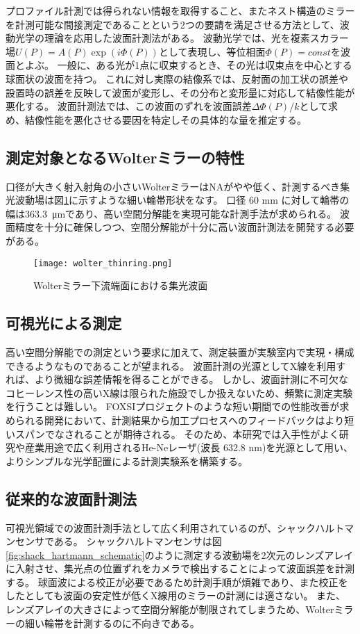 プロファイル計測では得られない情報を取得すること、またネスト構造のミラーを計測可能な間接測定であることという2つの要請を満足させる方法として、波動光学の理論を応用した波面計測法がある。
波動光学では、光を複素スカラー場$U(P)=A(P)\exp(i\Phi(P))$として表現し、等位相面$\Phi(P)=const$を波面とよぶ。
一般に、ある光が1点に収束するとき、その光は収束点を中心とする球面状の波面を持つ。
これに対し実際の結像系では、反射面の加工状の誤差や設置時の誤差を反映して波面が変形し、その分布と変形量に対応して結像性能が悪化する。
波面計測法では、この波面のずれを波面誤差$\Delta\Phi(P)/k$として求め、結像性能を悪化させる要因を特定しその具体的な量を推定する。

\subsection{測定対象となるWolterミラーの特性}
\label{chap1_wolter_specific_feature}

口径が大きく射入射角の小さいWolterミラーはNAがやや低く、計測するべき集光波動場は図\ref{fig:wolter_thinring}に示すような細い輪帯形状をなす。
口径 60 mm に対して輪帯の幅は\SI{363.3}{\micro \metre}であり、高い空間分解能を実現可能な計測手法が求められる。
波面精度を十分に確保しつつ、空間分解能が十分に高い波面計測法を開発する必要がある。

\begin{figure}[h!]
\centering
\texttt{[image: wolter\_thinring.png]}
\caption{Wolterミラー下流端面における集光波面}
\label{fig:wolter_thinring}
\end{figure}

\subsection{可視光による測定}
\label{chap1_visible_light_measurement}

高い空間分解能での測定という要求に加えて、測定装置が実験室内で実現・構成できるようなものであることが望まれる。
波面計測の光源としてX線を利用すれば、より微細な誤差情報を得ることができる。
しかし、波面計測に不可欠なコヒーレンス性の高いX線は限られた施設でしか扱えないため、頻繁に測定実験を行うことは難しい。
FOXSIプロジェクトのような短い期間での性能改善が求められる開発において、計測結果から加工プロセスへのフィードバックはより短いスパンでなされることが期待される。
そのため、本研究では入手性がよく研究や産業用途で広く利用されるHe-Neレーザ(波長 632.8 nm)を光源として用い、よりシンプルな光学配置による計測実験系を構築する。

\subsection{従来的な波面計測法}
\label{chap1_conventional_wave_metrics}
可視光領域での波面計測手法として広く利用されているのが、シャックハルトマンセンサである。
シャックハルトマンセンサは図\ref{fig:shack_hartmann_schematic}のように測定する波動場を2次元のレンズアレイに入射させ、集光点の位置ずれをカメラで検出することによって波面誤差を計測する。
球面波による校正が必要であるため計測手順が煩雑であり、また校正をしたとしても波面の安定性が低くX線用のミラーの計測には適さない。
また、レンズアレイの大きさによって空間分解能が制限されてしまうため、Wolterミラーの細い輪帯を計測するのに不向きである。

